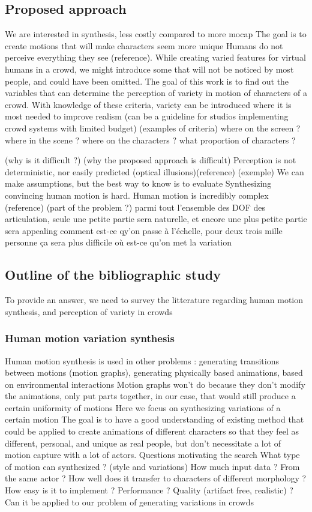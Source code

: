 \documentclass[11pt]{sdm}
\begin{document}
\subsection{Proposed approach}
We are interested in synthesis, less costly compared to more mocap
The goal is to create motions that will make characters seem more unique
Humans do not perceive everything they see (reference). 
While creating varied features for virtual humans in a crowd, we might introduce some that will not be noticed by most people, and could have been omitted.
The goal of this work is to find out the variables that can determine the perception of variety in motion of characters of a crowd.
With knowledge of these criteria, variety can be introduced where it is most needed to improve realism
(can be a guideline for studios implementing crowd systems with limited budget)
(examples of criteria)
where on the screen ? where in the scene ? where on the characters ? what proportion of characters ?

(why is it difficult ?) 
(why the proposed approach is difficult)
Perception is not deterministic, nor easily predicted (optical illusions)(reference)
(exemple)
We can make assumptions, but the best way to know is to evaluate
Synthesizing convincing human motion is hard. Human motion is incredibly complex (reference) (part of the problem ?)
parmi tout l'ensemble des DOF des articulation, seule une petite partie sera naturelle, et encore une plus petite partie sera appealing
comment est-ce qy'on passe à l'échelle, pour deux trois mille personne ça sera plus difficile 
où est-ce qu'on met la variation 

\subsection{Outline of the bibliographic study}
To provide an answer, we need to survey the litterature regarding human motion synthesis, and perception of variety in crowds

\subsubsection{Human motion variation synthesis}
Human motion synthesis is used in other problems : generating transitions between motions (motion graphs), generating physically based animations, based on environmental interactions
Motion graphs won't do because they don't modify the animations, only put parts together, in our case, that would still produce a certain uniformity of motions
Here we focus on synthesizing variations of a certain motion 
The goal is to have a good understanding of existing method that could be applied to create animations of different characters so that they feel as different, personal, and unique as real people, but don't necessitate a lot of motion capture with a lot of actors.
Questions motivating the search
What type of motion can synthesized ? (style and variations)
How much input data ? From the same actor ? How well does it transfer to characters of different morphology ?
How easy is it to implement ? Performance ? Quality (artifact free, realistic) ? 
Can it be applied to our problem of generating variations in crowds 
\end{document}
